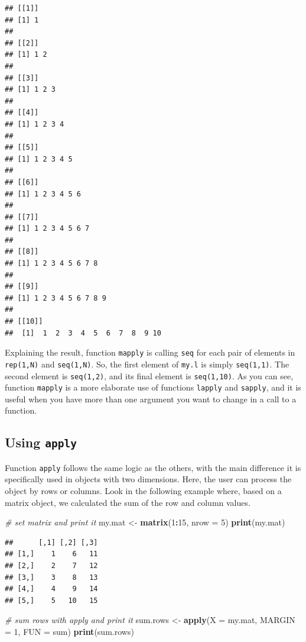 \documentclass[11pt,]{book}
\newenvironment{Shaded}{\begin{snugshade}}{\end{snugshade}}
\newcommand{\KeywordTok}[1]{\textcolor[rgb]{0.27,0.27,0.27}{\textbf{#1}}}
\newcommand{\DataTypeTok}[1]{\textcolor[rgb]{0.27,0.27,0.27}{#1}}
\newcommand{\DecValTok}[1]{\textcolor[rgb]{0.06,0.06,0.06}{#1}}
\newcommand{\StringTok}[1]{\textcolor[rgb]{0.5,0.5,0.5}{#1}}
\newcommand{\CommentTok}[1]{\textcolor[rgb]{0.56,0.35,0.01}{\textit{#1}}}
\newcommand{\OperatorTok}[1]{\textcolor[rgb]{0.81,0.36,0.00}{\textbf{#1}}}
\newcommand{\NormalTok}[1]{#1}
\begin{document}
\begin{verbatim}
## [[1]]
## [1] 1
## 
## [[2]]
## [1] 1 2
## 
## [[3]]
## [1] 1 2 3
## 
## [[4]]
## [1] 1 2 3 4
## 
## [[5]]
## [1] 1 2 3 4 5
## 
## [[6]]
## [1] 1 2 3 4 5 6
## 
## [[7]]
## [1] 1 2 3 4 5 6 7
## 
## [[8]]
## [1] 1 2 3 4 5 6 7 8
## 
## [[9]]
## [1] 1 2 3 4 5 6 7 8 9
## 
## [[10]]
##  [1]  1  2  3  4  5  6  7  8  9 10
\end{verbatim}

Explaining the result, function \texttt{mapply} is calling \texttt{seq}
for each pair of elements in \texttt{rep(1,N)} and \texttt{seq(1,N)}.
So, the first element of \texttt{my.l} is simply \texttt{seq(1,1)}. The
second element is \texttt{seq(1,2)}, and its final element is
\texttt{seq(1,10)}. As you can see, function \texttt{mapply} is a more
elaborate use of functions \texttt{lapply} and \texttt{sapply}, and it
is useful when you have more than one argument you want to change in a
call to a function.

\subsection{\texorpdfstring{Using
\texttt{apply}}{Using apply}}\label{using-apply}

Function \texttt{apply} follows the same logic as the others, with the
main difference it is specifically used in objects with two dimensions.
Here, the user can process the object by rows or columns. Look in the
following example where, based on a matrix object, we calculated the sum
of the row and column values. 

\begin{Shaded}
\begin{Highlighting}[]
\CommentTok{# set matrix and print it}
\NormalTok{my.mat <-}\StringTok{ }\KeywordTok{matrix}\NormalTok{(}\DecValTok{1}\OperatorTok{:}\DecValTok{15}\NormalTok{, }\DataTypeTok{nrow =} \DecValTok{5}\NormalTok{)}
\KeywordTok{print}\NormalTok{(my.mat)}
\end{Highlighting}
\end{Shaded}

\begin{verbatim}
##      [,1] [,2] [,3]
## [1,]    1    6   11
## [2,]    2    7   12
## [3,]    3    8   13
## [4,]    4    9   14
## [5,]    5   10   15
\end{verbatim}

\begin{Shaded}
\begin{Highlighting}[]
\CommentTok{# sum rows with apply and print it}
\NormalTok{sum.rows <-}\StringTok{ }\KeywordTok{apply}\NormalTok{(}\DataTypeTok{X =}\NormalTok{ my.mat, }\DataTypeTok{MARGIN =} \DecValTok{1}\NormalTok{, }\DataTypeTok{FUN =}\NormalTok{ sum)}
\KeywordTok{print}\NormalTok{(sum.rows)}
\end{Highlighting}
\end{Shaded}
\end{document}
